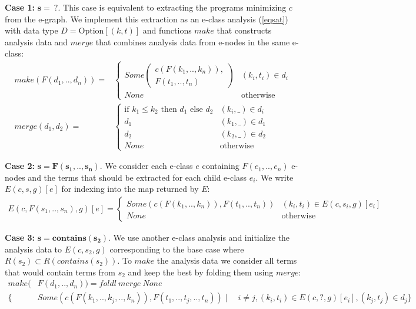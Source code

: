 \smallskip

\textbf{Case 1:} $\bm{s =\ ?}$.
This case is equivalent to extracting the programs minimizing $c$ from the e-graph.
We implement this extraction as an e-class analysis (\cref{eqsat}) with data type $D = \text{Option}[(k, t)]$ and functions $make$ that constructs analysis data and $merge$ that combines analysis data from e-nodes in the same e-class:
\small
\begin{align*}
make(F(d_1, .., d_n)) = &\begin{cases}
  Some\left(\begin{array}{l}
    c(F(k_1, .., k_n)),\\
    F(t_1, .., t_n)
  \end{array}\right) & (k_i, t_i) \in d_i \\
  None & \text{otherwise}
\end{cases}\\
merge(d_1, d_2) = &\begin{cases}
  \text{if } k_1 \leq k_2 \text{ then } d_1 \text{ else } d_2 & (k_i, \_) \in d_i \\
  d_1 & (k_1, \_) \in d_1 \\
  d_2 & (k_2, \_) \in d_2 \\
  None & \text{otherwise}
\end{cases}
\end{align*}
\normalsize

\textbf{Case 2:} $\bm{s = F(s_1, .., s_n)}$.
We consider each e-class $e$ containing $F(e_1, .., e_n)$ e-nodes and the terms that should be extracted for each child e-class $e_i$.
We write $E(c,s, g)[e]$ for indexing into the map returned by $E$:
\small
\begin{align*}
E(c, F(s_1, .., s_n), g)[e] = \begin{cases}
  Some(c(F(k_1, .., k_n)), F(t_1, .., t_n)) & (k_i, t_i) \in E(c, s_i, g)[e_i] \\
  None & \text{otherwise}
\end{cases}
\end{align*}
\normalsize

\textbf{Case 3:} $\bm{s = contains(s_2)}$.
We use another e-class analysis and initialize the analysis data to $E(c, s_2, g)$ corresponding to the base case where $R(s_2) \subset R(contains(s_2))$.
To $make$ the analysis data we consider all terms that would contain terms from $s_2$ and keep the best by folding them using $merge$:
\small
\begin{align*}
make(&F(d_1, .., d_n)) = foldl~merge~None \\
  \{ &Some(c(F(k_1, .., k_j, .., k_n)), F(t_1, .., t_j, .., t_n)) \mid
     \quad i \neq j, (k_i, t_i) \in E(c, ?, g)[e_i], (k_j, t_j) \in d_j \}
\end{align*}
\normalsize

